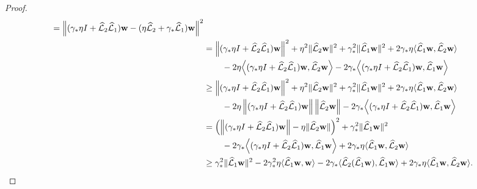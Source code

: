 \documentclass[review]{siamart}
\begin{document}
\begin{proof}
\begin{align}
= \left\|(\gamma_*\eta I + \widehat{\mathcal{L}}_2\widehat{\mathcal{L}}_1)\mathbf{w} -
	(\eta\widehat{\mathcal{L}}_2 + \gamma_*\widehat{\mathcal{L}}_1)\mathbf{w}\right\|^2 \nonumber\\
& = \left\|(\gamma_*\eta I + \widehat{\mathcal{L}}_2\widehat{\mathcal{L}}_1)\mathbf{w}\right\|^2
	+ \eta^2\|\widehat{\mathcal{L}}_2\mathbf{w}\|^2
	+ \gamma_*^2\|\widehat{\mathcal{L}}_1\mathbf{w}\|^2
	+ 2\gamma_*\eta\langle\widehat{\mathcal{L}}_1\mathbf{w},\widehat{\mathcal{L}}_2\mathbf{w}\rangle
	\nonumber\\ & \hspace{5ex}
	- 2\eta\Big\langle (\gamma_*\eta I + \widehat{\mathcal{L}}_2\widehat{\mathcal{L}}_1)\mathbf{w},
		\widehat{\mathcal{L}}_2\mathbf{w}\Big\rangle
	- 2\gamma_*\Big\langle (\gamma_*\eta I + \widehat{\mathcal{L}}_2\widehat{\mathcal{L}}_1)\mathbf{w},
		\widehat{\mathcal{L}}_1\mathbf{w}\Big\rangle \nonumber\\
& \geq \left\|(\gamma_*\eta I + \widehat{\mathcal{L}}_2\widehat{\mathcal{L}}_1)\mathbf{w}\right\|^2
	+ \eta^2\|\widehat{\mathcal{L}}_2\mathbf{w}\|^2
	+ \gamma_*^2\|\widehat{\mathcal{L}}_1\mathbf{w}\|^2
	+ 2\gamma_*\eta\langle\widehat{\mathcal{L}}_1\mathbf{w},\widehat{\mathcal{L}}_2\mathbf{w}\rangle
	\nonumber\\ & \hspace{5ex}
	- 2\eta\left\| (\gamma_*\eta I + \widehat{\mathcal{L}}_2\widehat{\mathcal{L}}_1)\mathbf{w}\right\|
		\left\|\widehat{\mathcal{L}}_2\mathbf{w}\right\|
	- 2\gamma_*\Big\langle (\gamma_*\eta I + \widehat{\mathcal{L}}_2\widehat{\mathcal{L}}_1)\mathbf{w},
		\widehat{\mathcal{L}}_1\mathbf{w}\Big\rangle \nonumber\\
& = \left( \left\|(\gamma_*\eta I + \widehat{\mathcal{L}}_2\widehat{\mathcal{L}}_1)\mathbf{w}\right\|
		- \eta\|\widehat{\mathcal{L}}_2\mathbf{w}\|\right)^2
	+ \gamma_*^2\|\widehat{\mathcal{L}}_1\mathbf{w}\|^2
	\nonumber\\ & \hspace{5ex}
	- 2\gamma_*\Big\langle (\gamma_*\eta I + \widehat{\mathcal{L}}_2\widehat{\mathcal{L}}_1)\mathbf{w},
		\widehat{\mathcal{L}}_1\mathbf{w}\Big\rangle
	+ 2\gamma_*\eta\langle\widehat{\mathcal{L}}_1\mathbf{w},\widehat{\mathcal{L}}_2\mathbf{w}\rangle \nonumber\\
& \geq \gamma_*^2\|\widehat{\mathcal{L}}_1\mathbf{w}\|^2
	- 2\gamma_*^2\eta\langle \widehat{\mathcal{L}}_1 \mathbf{w}, \mathbf{w}\rangle
	- 2\gamma_*\langle \widehat{\mathcal{L}}_2(\widehat{\mathcal{L}}_1\mathbf{w}),
		\widehat{\mathcal{L}}_1\mathbf{w}\rangle
	+ 2\gamma_*\eta\langle\widehat{\mathcal{L}}_1\mathbf{w},\widehat{\mathcal{L}}_2\mathbf{w}\rangle.
		\label{eq:den_gen}
\end{align}
%


\end{proof}
\end{document}
